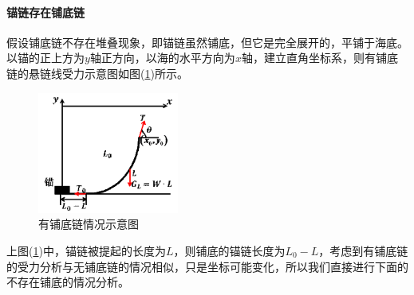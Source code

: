 \documentclass[UTF8]{ctexbook}
\theoremstyle{nonumberplain}
\begin{document}
            \paragraph{锚链存在铺底链}假设铺底链不存在堆叠现象，即锚链虽然铺底，但它是完全展开的，平铺于海底。以锚的正上方为$y$轴正方向，以海的水平方向为$x$轴，建立直角坐标系，则有铺底链的悬链线受力示意图如图(\ref{fig:有铺底链情况示意图})所示。
            \begin{figure}[H]
            \centering
            \includegraphics[height=4cm]{images/bottom_chain.jpg}
            \caption{有铺底链情况示意图}
            \label{fig:有铺底链情况示意图}
            \end{figure}
            \par
            上图(\ref{fig:有铺底链情况示意图})中，锚链被提起的长度为$L$，则铺底的锚链长度为$L_0-L$，考虑到有铺底链的受力分析与无铺底链的情况相似，只是坐标可能变化，所以我们直接进行下面的不存在铺底的情况分析。
\end{document}
